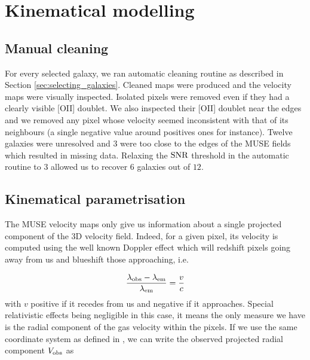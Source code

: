 \clearpage
\section{Kinematical modelling}
\label{sec:kinematical_modelling}

\subsection{Manual cleaning}

For every selected galaxy, we ran automatic cleaning routine as described in Section \ref{sec:selecting_galaxies}. Cleaned maps were produced and the velocity maps were visually inspected. Isolated pixels were removed even if they had a clearly visible [OII] doublet. We also inspected their [OII] doublet near the edges and we removed any pixel whose velocity seemed inconsistent with that of its neighbours (a single negative value around positives ones for instance). Twelve galaxies were unresolved and $3$ were too close to the edges of the MUSE fields which resulted in missing data. Relaxing the $\rm{SNR}$ threshold in the automatic routine to $3$ allowed us to recover $6$ galaxies out of $12$. 

\subsection{Kinematical parametrisation}

The MUSE velocity maps only give us information about a single projected component of the 3D velocity field. Indeed, for a given pixel, its velocity is computed using the well known Doppler effect which will redshift pixels going away from us and blueshift those approaching, i.e.

\begin{equation}
	\frac{\lambda_{\rm{obs}} - \lambda_{\rm{em}}}{\lambda_{\rm{em}}} = \frac{v}{c}
\end{equation}
with $v$ positive if it recedes from us and negative if it approaches. Special relativistic effects being negligible in this case, it means the only measure we have is the radial component of the gas velocity within the pixels. If we use the same coordinate system as defined in , we can write the observed projected radial component $V_{\rm{obs}}$ as 

